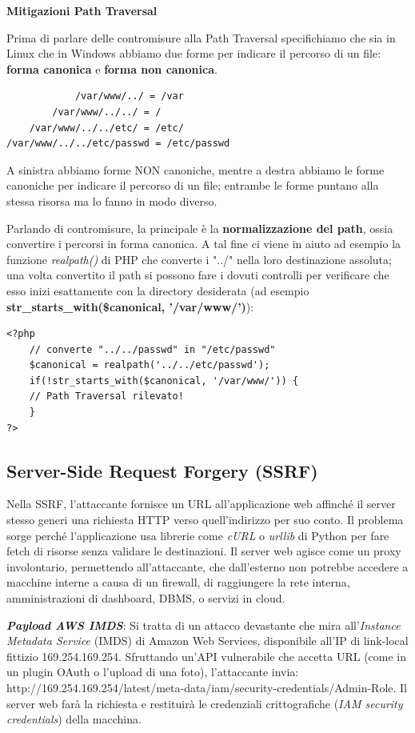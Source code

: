 \textbf{Mitigazioni Path Traversal}

Prima di parlare delle contromisure alla Path Traversal specifichiamo che sia
in Linux che in Windows abbiamo due forme per indicare il percorso di un file:
\textbf{forma canonica} e \textbf{forma non canonica}.

\begin{lstlisting}
            /var/www/../ = /var
        /var/www/../../ = /
    /var/www/../../etc/ = /etc/
/var/www/../../etc/passwd = /etc/passwd
\end{lstlisting}

A sinistra abbiamo forme NON canoniche, mentre a destra abbiamo le forme 
canoniche per indicare il percorso di un file; entrambe le forme puntano 
alla stessa risorsa ma lo fanno in modo diverso.

Parlando di contromisure, la principale è la \textbf{normalizzazione del path}, 
ossia convertire i percorsi in forma canonica. A tal fine ci viene in aiuto 
ad esempio la funzione \textit{realpath()} di PHP che converte i "../" nella 
loro destinazione assoluta; una volta convertito il path si possono fare i 
dovuti controlli per verificare che esso inizi esattamente con la directory
desiderata (ad esempio \textbf{str\_starts\_with(\$canonical, '/var/www/')}):

\begin{lstlisting}
<?php
    // converte "../../passwd" in "/etc/passwd"
    $canonical = realpath('../../etc/passwd');
    if(!str_starts_with($canonical, '/var/www/')) {
    // Path Traversal rilevato!
    }
?>
\end{lstlisting}

\subsection{Server-Side Request Forgery (SSRF)}

Nella SSRF, l'attaccante fornisce un URL all'applicazione web affinché il 
server stesso generi una richiesta HTTP verso quell'indirizzo per suo conto. 
Il problema sorge perché l'applicazione usa librerie come \textit{cURL} o \textit{urllib} 
di Python per fare fetch di risorse senza validare le destinazioni. Il 
server web agisce come un proxy involontario, permettendo all'attaccante, 
che dall'esterno non potrebbe accedere a macchine interne a causa di un 
firewall, di raggiungere la rete interna, amministrazioni di dashboard, 
DBMS, o servizi in cloud.

\textit{\textbf{Payload AWS IMDS}}: Si tratta di un attacco devastante che mira all'\textit{Instance Metadata Service} (IMDS) di 
Amazon Web Services, disponibile all'IP di link-local fittizio 
169.254.169.254. Sfruttando un'API vulnerabile che accetta URL 
(come in un plugin OAuth o l'upload di una foto), l'attaccante invia: 
http://169.254.169.254/latest/meta-data/iam/security-credentials/Admin-Role. 
Il server web farà la richiesta e restituirà le credenziali crittografiche 
(\textit{IAM security credentials}) della macchina.

